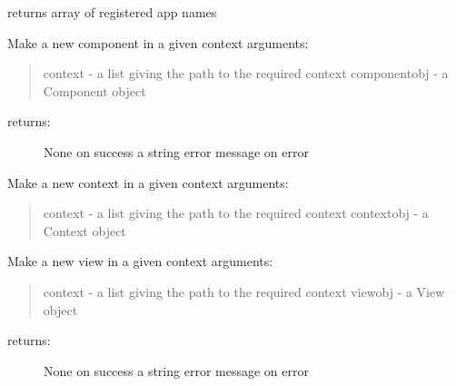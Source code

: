 \documentclass[letterpaper,10pt,english]{sphinxmanual}
\begin{document}
\begin{fulllineitems}
\begin{fulllineitems}
\label{personis.client:personis.client.Access.listapps}
returns array of registered app names

\end{fulllineitems}


\begin{fulllineitems}
\label{personis.client:personis.client.Access.mkcomponent}
Make a new component in a given context
arguments:
\begin{quote}

context - a list giving the path to the required context
componentobj - a Component object
\end{quote}
\begin{description}
\item[{returns:}] \leavevmode
None on success
a string error message on error

\end{description}

\end{fulllineitems}


\begin{fulllineitems}
\label{personis.client:personis.client.Access.mkcontext}
Make a new context in a given context
arguments:
\begin{quote}

context - a list giving the path to the required context
contextobj - a Context object
\end{quote}

\end{fulllineitems}


\begin{fulllineitems}
\label{personis.client:personis.client.Access.mkview}
Make a new view in a given context
arguments:
\begin{quote}

context - a list giving the path to the required context
viewobj - a View object
\end{quote}
\begin{description}
\item[{returns:}] \leavevmode
None on success
a string error message on error


\end{description}
\end{fulllineitems}
\end{fulllineitems}
\end{document}
